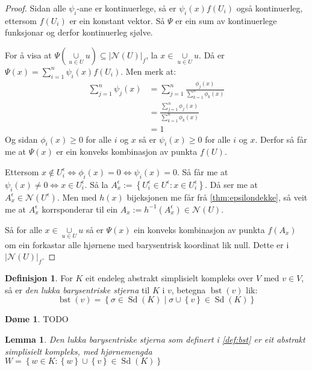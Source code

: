 \documentclass[a4paper, 12pt, norsk]{article}
\theoremstyle{plain}
\newtheorem{lemma}[theorem]{Lemma}
\theoremstyle{definition}
\newtheorem{definition}[theorem]{Definisjon}
\newtheorem{example}[theorem]{Døme}
\newcommand{\Nc}{\mathcal{N}}
\newcommand{\union}{ \mathop{\cup}\limits }
\newcommand{\gr}[1]{ \lvert #1 \rvert } %
\newcommand{\set}[1]{ \left \{ #1 \right \} } %
\newcommand{\tuple}[1]{ \left( #1 \right) } %
\DeclareMathOperator{\Sd}{Sd}
\DeclareMathOperator{\bst}{bst}
\begin{document}
\begin{proof} %
	Sidan alle \( \psi_i \)-ane er kontinuerlege, så er \( \psi_i(x) f(U_i) \) også kontinuerleg, ettersom \( f(U_i) \) er ein konstant vektor. Så \( \Psi \) er ein sum av kontinuerlege funksjonar og derfor kontinuerleg sjølve.

	For å visa at \( \Psi\tuple{\union_{u \in U} u} \subseteq \gr{\Nc(U)}_f \), la \( x \in \union_{u \in U} u \). Då er \( \Psi(x) = \sum_{i=1}^n \psi_i(x)f(U_i) \). Men merk at:
	\begin{align*}
		\sum_{j=1}^n \psi_j(x)  &= \sum_{j=1}^n \frac{\phi_j(x)}{\sum_{k=1}^n \phi_k(x)} \\
		&= \frac{\sum_{j=1}^n \phi_j(x)}{\sum_{k=1}^n \phi_k(x)} \\
		&= 1
	\end{align*}
	Og sidan \( \phi_i(x) \geq 0 \) for alle \( i \) og \( x \) så er \( \psi_i(x) \geq 0 \) for alle \( i \) og \( x \). Derfor så får me at \( \Psi(x) \) er ein konveks kombinasjon av punkta \( f(U) \).

	Ettersom \( x \not\in U_i^\epsilon \iff \phi_i(x) = 0 \iff \psi_i(x) = 0 \). Så får me at \( \psi_i(x) \neq 0 \iff x \in U_i^\epsilon \). Så la \( A_x^\epsilon := \set{U_i^\epsilon \in U^\epsilon : x \in U_i^\epsilon} \). Då ser me at \( A_x^\epsilon \in \Nc(U^\epsilon) \). Men med \( h(x) \) bijeksjonen me får frå \autoref{thm:epsilondekke}, så veit me at \( A_x^\epsilon \) korrsponderar til ein \( A_x := h^{-1}(A_x^\epsilon) \in \Nc(U) \).
	
	Så for alle \( x \in \union_{u \in U} u \) så er \( \Psi(x) \) ein konveks kombinasjon av punkta \( f(A_x) \) om ein forkastar alle hjørnene med barysentrisk koordinat lik null. Dette er i \( \gr{\Nc(U)}_f \).
\end{proof}

\begin{definition} \label{def:bst}
	For \( K \) eit endeleg abstrakt simplisielt kompleks over \( V \) med \( v \in V \), så er \emph{den lukka barysentriske stjerna} til \( K \) i \( v \), betegna \( \bst(v) \) lik:
	\[
		\bst(v) = \set{\sigma \in \Sd(K) \mid \sigma \union \set{v} \in \Sd(K)}
	\]
\end{definition}

\begin{example}
	TODO
\end{example}

\begin{lemma} \label{thm:bst-ask}
	Den lukka barysentriske stjerna som definert i \autoref{def:bst} er eit abstrakt simplisielt kompleks, med hjørnemengda \( W = \set{w \in K : \set{w} \union \set{v} \in \Sd(K)} \)
\end{lemma}
\end{document}
